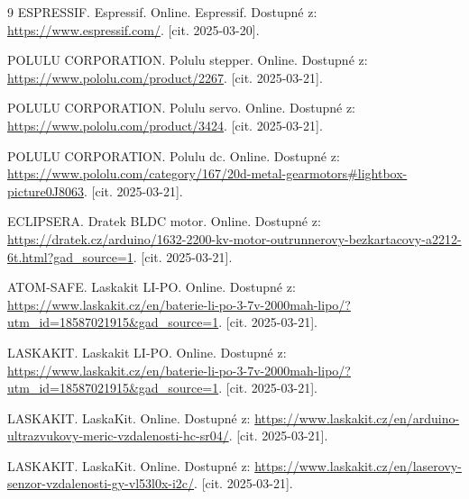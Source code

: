 \begin{thebibliography}{9}
	ESPRESSIF. Espressif. Online. Espressif. Dostupné z: \url{https://www.espressif.com/}. [cit. 2025-03-20].

	POLULU CORPORATION. Polulu stepper. Online. Dostupné z: \url{https://www.pololu.com/product/2267}. [cit. 2025-03-21].

	POLULU CORPORATION. Polulu servo. Online. Dostupné z: \url{https://www.pololu.com/product/3424}. [cit. 2025-03-21].

	POLULU CORPORATION. Polulu dc. Online. Dostupné z: \url{https://www.pololu.com/category/167/20d-metal-gearmotors#lightbox-picture0J8063}. [cit. 2025-03-21].

	ECLIPSERA. Dratek BLDC motor. Online. Dostupné z: \url{https://dratek.cz/arduino/1632-2200-kv-motor-outrunnerovy-bezkartacovy-a2212-6t.html?gad_source=1}. [cit. 2025-03-21].

	ATOM-SAFE. Laskakit LI-PO. Online. Dostupné z: \url{https://www.laskakit.cz/en/baterie-li-po-3-7v-2000mah-lipo/?utm_id=18587021915&gad_source=1}. [cit. 2025-03-21].

	LASKAKIT. Laskakit LI-PO. Online. Dostupné z: \url{https://www.laskakit.cz/en/baterie-li-po-3-7v-2000mah-lipo/?utm_id=18587021915&gad_source=1}. [cit. 2025-03-21].

	LASKAKIT. LaskaKit. Online. Dostupné z: \url{https://www.laskakit.cz/en/arduino-ultrazvukovy-meric-vzdalenosti-hc-sr04/}. [cit. 2025-03-21].

	LASKAKIT. LaskaKit. Online. Dostupné z: \url{https://www.laskakit.cz/en/laserovy-senzor-vzdalenosti-gy-vl53l0x-i2c/}. [cit. 2025-03-21].


\end{thebibliography}


%
%
%
